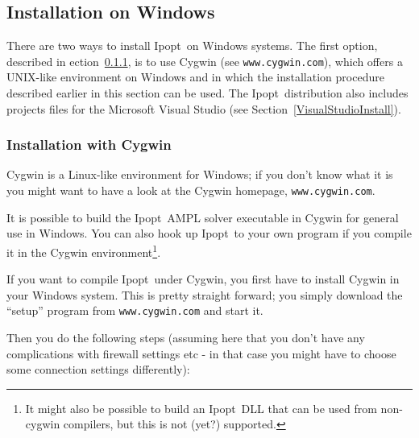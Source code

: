 \documentclass[letter,10pt]{article}
\newcommand{\Ipopt}{{\sc Ipopt}}
\begin{document}
\subsection{Installation on Windows}\label{WindowsInstall}

There are two ways to install \Ipopt\ on Windows systems.  The first
option, described in ection~\ref{CygwinInstall}, is to use Cygwin (see
\texttt{www.cygwin.com}), which offers a UNIX-like environment
on Windows and in which the installation procedure described earlier
in this section can be used.  The \Ipopt\ distribution also includes
projects files for the Microsoft Visual Studio (see
Section~\ref{VisualStudioInstall}).

\subsubsection{Installation with Cygwin}\label{CygwinInstall}

Cygwin is a Linux-like environment for Windows; if you don't know what
it is you might want to have a look at the Cygwin homepage,
\texttt{www.cygwin.com}.

It is possible to build the \Ipopt\ AMPL solver executable in Cygwin
for general use in Windows.  You can also hook up \Ipopt\ to your own
program if you compile it in the Cygwin environment\footnote{It might
  also be possible to build an \Ipopt\ DLL that can be used from
  non-cygwin compilers, but this is not (yet?) supported.}.

If you want to compile \Ipopt\ under Cygwin, you first have to install
Cygwin in your Windows system.  This is pretty straight forward; you
simply download the ``setup'' program from
\texttt{www.cygwin.com} and start it.

Then you do the following steps (assuming here that you don't have any
complications with firewall settings etc - in that case you might have
to choose some connection settings differently):
\end{document}
